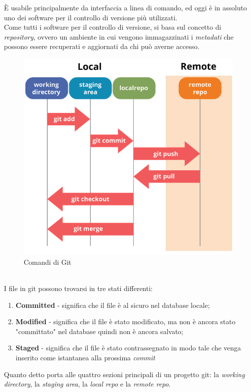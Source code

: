 È usabile principalmente da interfaccia a linea di comando, ed oggi è in assoluto uno dei software per il controllo di versione più utilizzati.\\
Come tutti i software per il controllo di versione, si basa sul concetto di \emph{\gls{repository}}\glsfirstoccur\cite{gitSite}, ovvero un ambiente in cui vengono immagazzinati i \emph{\gls{metadati}}\glsfirstoccur\cite{gitGuida} che possono essere recuperati e aggiornati da chi può averne accesso.
\begin{figure}[h]
	\centering
	\includegraphics[scale=0.5]{immagini/gitCommands}
	\caption{Comandi di Git \cite{gitGuida}}
\end{figure}
\\
I file in \gls{git} possono trovarsi in tre stati differenti:
\begin{enumerate}
	\item \textbf{Committed} - significa che il file è al sicuro nel database locale;
	\item \textbf{Modified} - significa che il file è stato modificato, ma non è ancora stato "committato" nel database quindi non è ancora salvato;
	\item \textbf{Staged} - significa che il file è stato contrassegnato in modo tale che venga inserito come istantanea alla prossima \emph{\gls{commit}}\glsfirstoccur
\end{enumerate}
Quanto detto porta alle quattro sezioni principali di un progetto \gls{git}: la \textit{working directory}, la \textit{staging area}, la \textit{local repo} e la \textit{remote repo}.

